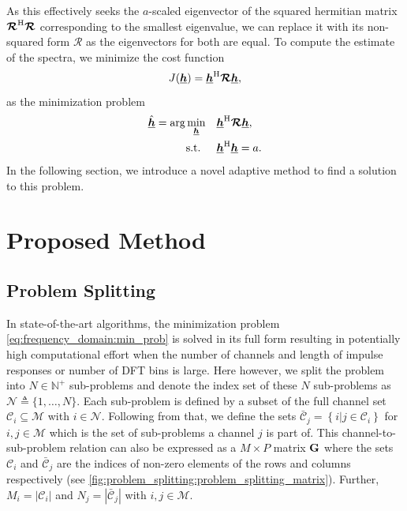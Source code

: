 \documentclass{article}
\newcommand{\hf}{\underline{\bm{h}}}
\newcommand{\Rf}{\bm{\mathcal{R}}}
\newcommand{\Cset}{\mathcal{C}}
\newcommand{\Csetb}{\bar{\mathcal{C}}}
\newcommand{\Mset}{\mathcal{M}}
\newcommand{\Nset}{\mathcal{N}}
\begin{document}
As this effectively seeks the \(a\)-scaled eigenvector of the squared hermitian matrix \(\Rf^\herm \Rf\) corresponding to the smallest eigenvalue, we can replace it with its non-squared form \(\Rf\) as the eigenvectors for both are equal.
To compute the estimate of the spectra, we minimize the cost function
\begin{equation}
    J(\hf) = \hf^\herm \Rf \hf,\label{eq:frequency_domain:cost_function}
\end{equation}
as the minimization problem
\begin{align}
    \hat{\hf} = \arg \min_{\hf} \quad &\hf^\herm \Rf \hf, \label{eq:frequency_domain:min_prob}\\
    \text{s.t. } \quad &\hf^\herm \hf = a.
\end{align}
In the following section, we introduce a novel adaptive method to find a solution to this problem.

\section{Proposed Method}
\label{sec:proposed_method}

\subsection{Problem Splitting}
\label{ssec:problem_splitting}
In state-of-the-art algorithms, the minimization problem \eqref{eq:frequency_domain:min_prob} is solved in its full form resulting in potentially high computational effort when the number of channels and length of impulse responses or number of DFT bins is large.
Here however, we split the problem into \(N \in \mathbb{N}^+\) sub-problems and denote the index set of these \(N\) sub-problems as \(\Nset \triangleq \{1,\ldots,N\}\).
Each sub-problem is defined by a subset of the full channel set \(\Cset_i \subseteq \Mset\) with \(i \in \Nset\).
Following from that, we define the sets \(\Csetb_j = \left\{ i \vert j \in \Cset_i \right\}\) for \(i,j \in \Mset\) which is the set of sub-problems a channel  \(j\) is part of.
This channel-to-sub-problem relation can also be expressed as a \(M \times P\) matrix \(\bm{\mathrm{G}}\) where the sets \(\Cset_i\) and \(\Csetb_j\) are the indices of non-zero elements of the rows and columns respectively (see \autoref{fig:problem_splitting:problem_splitting_matrix}).
Further, \(M_i = \left| \Cset_i \right| \) and \(N_j = \left| \Csetb_j \right| \) with \(i,j \in \Mset\).
\end{document}
